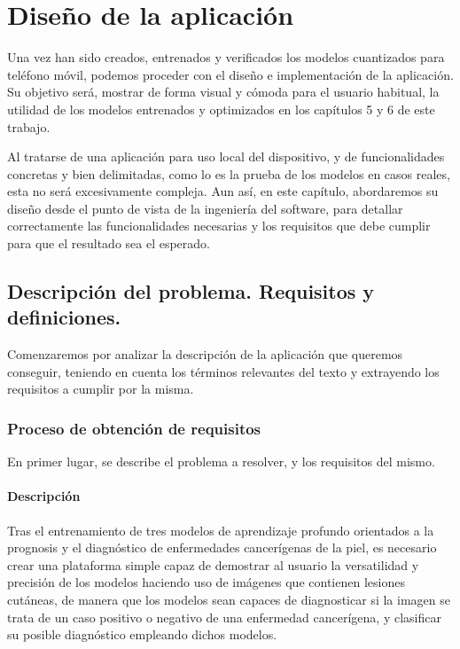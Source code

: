 \chapter{Diseño de la aplicación}

Una vez han sido creados, entrenados y verificados los modelos cuantizados para teléfono móvil, podemos proceder con el diseño e implementación de la aplicación. Su objetivo será, mostrar de forma visual y cómoda para el usuario habitual, la utilidad de los modelos entrenados y optimizados en los capítulos 5 y 6 de este trabajo.

Al tratarse de una aplicación para uso local del dispositivo, y de funcionalidades concretas y bien delimitadas, como lo es la prueba de los modelos en casos reales, esta no será excesivamente compleja. Aun así, en este capítulo, abordaremos su diseño desde el punto de vista de la ingeniería del software, para detallar correctamente las funcionalidades necesarias y los requisitos que debe cumplir para que el resultado sea el esperado.

\section{Descripción del problema. Requisitos y definiciones.}

Comenzaremos por analizar la descripción de la aplicación que queremos conseguir, teniendo en cuenta los términos relevantes del texto y extrayendo los requisitos a cumplir por la misma.

\subsection{Proceso de obtención de requisitos}

En  primer lugar, se describe el problema a resolver, y los requisitos del mismo.

\subsubsection{Descripción}
Tras el entrenamiento de tres modelos de aprendizaje profundo orientados a la prognosis y el diagnóstico de enfermedades cancerígenas de la piel, es necesario crear una plataforma simple capaz de demostrar al usuario la versatilidad y precisión de los modelos haciendo uso de imágenes que contienen lesiones cutáneas, de manera que los modelos sean capaces de diagnosticar si la imagen se trata de un caso positivo o negativo de una enfermedad cancerígena, y clasificar su posible diagnóstico empleando dichos modelos.

